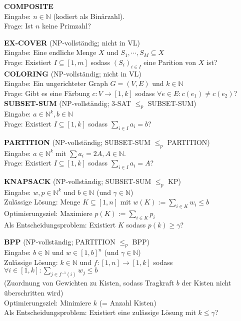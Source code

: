 \documentclass[a4paper,graphics,11pt]{article}
\begin{document}
\textbf{COMPOSITE}
\\[5pt]
Eingabe: $n \in \mathbb{N}$ (kodiert als Binärzahl).
\\[5pt]
Frage: Ist $n$ keine Primzahl?

\strut

\textbf{EX-COVER} (\textsf{NP}-vollständig; nicht in VL)
\\[5pt]
Eingabe: Eine endliche Menge $X$ und $S_1,\cdots,S_M \subseteq X$
\\[5pt]
Frage: Existiert $I \subseteq [1,m]$ sodass $(S_i)_{i \in I}$ eine Parition von $X$ ist?\\

\textbf{COLORING} (\textsf{NP}-vollständig; nicht in VL)
\\[5pt]
Eingabe: Ein ungerichteter Graph $G = (V,E)$ und $k \in \mathbb{N}$
\\[5pt]
Frage: Gibt es eine Färbung $c : V \to [1,k]$ sodass $\forall e \in E : c(e_1) \neq c(e_2)$?\\

\textbf{SUBSET-SUM} (\textsf{NP}-vollständig; 3-SAT $\leq_p$ SUBSET-SUM)
\\[5pt]
Eingabe: $a \in \mathbb{N}^k, b \in \mathbb{N}$
\\[5pt]
Frage: Existiert $I \subseteq [1,k]$ sodass $\displaystyle \sum_{i \in I}a_i = b$?

\newpage

\textbf{PARTITION} (\textsf{NP}-vollständig; SUBSET-SUM $\leq_p$ PARTITION)
\\[5pt]
Eingabe: $a \in \mathbb{N}^k$ mit $\sum a_i = 2A, A \in \mathbb{N}$.
\\[5pt]
Frage: Existiert $I \subseteq [1,k]$ sodass $\displaystyle \sum_{i \in I}a_i = A$?

\strut

\textbf{KNAPSACK} (\textsf{NP}-vollständig; SUBSET-SUM $\leq_p$ KP)
\\[10pt]
Eingabe: $w,p \in \mathbb{N}^k$ und $b\in \mathbb{N}$ (und $\gamma \in \mathbb{N}$)
\\[10pt]
Zulässige Lösung: Menge $K \subseteq [1,n]$ mit $w(K) := \sum_{i \in K} w_i \leq b$
\\[10pt]
Optimierungsziel: Maximiere $p(K) := \sum_{i \in K} p_i$
\\[10pt]
Als Entscheidungsproblem: Existiert $K$ sodass $p(k) \geq \gamma$?

\strut

\textbf{BPP} (\textsf{NP}-vollständig; PARTITION $\leq_p$ BPP)
\\[10pt]
Eingabe: $b \in \mathbb{N}$ und $w \in [1,b]^n$ (und $\gamma \in \mathbb{N}$)
\\[10pt]
Zulässige Lösung: $k \in \mathbb{N}$ und $f : [1,n] \to [1,k]$ sodass
$\displaystyle\forall i \in [1,k]: \sum_{j \in f^{-1}(i)} w_j \leq b$\\
(Zuordnung von Gewichten zu Kisten, sodass Tragkraft $b$ der Kisten nicht überschritten wird)
\\[10pt]
Optimierungsziel: Minimiere $k$ (= Anzahl Kisten)
\\[10pt]
Als Entscheidungsproblem: Existiert eine zulässige Lösung mit $k \leq \gamma$?
\end{document}
